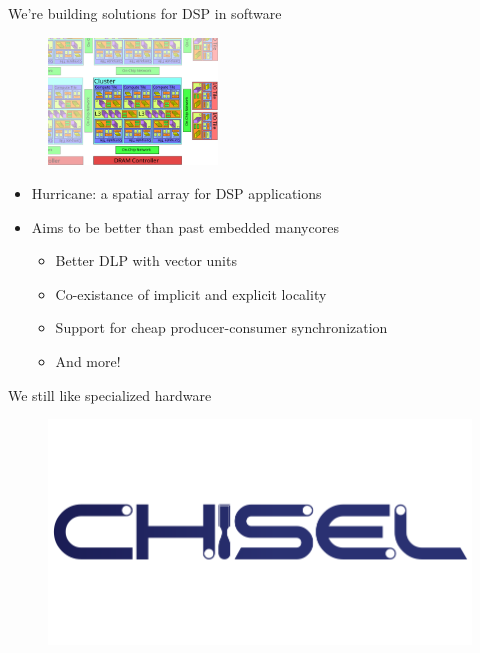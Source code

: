 \documentclass{beamer}
\begin{document}
\begin{frame}{We're building solutions for DSP in software}
  \begin{figure}
    \centering
    \includegraphics[width=0.4\textwidth]{figs/fabric.svg}
  \end{figure}
  \begin{itemize}
    \item Hurricane: a spatial array for DSP applications
    \item Aims to be better than past embedded manycores
      \begin{itemize}
        \item Better DLP with vector units
        \item Co-existance of implicit and explicit locality
        \item Support for cheap producer-consumer synchronization
        \item And more!
      \end{itemize}
  \end{itemize}
\end{frame}

\begin{frame}{We still like specialized hardware}
  \begin{figure}
    \centering
    \includegraphics[width=\textwidth]{figs/chisel.svg}
  \end{figure}
\end{frame}
\end{document}
